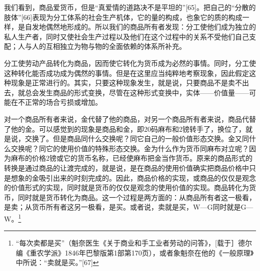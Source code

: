 \documentclass{ctexbook}
\begin{document}
        
        我们看到，商品爱货币，但是“真爱情的道路决不是平坦的”[65]。把自己的“分散的肢体”[66]表现为分工体系的社会生产机体，它的量的构成，也象它的质的构成一样，是自发地偶然地形成的。所以我们的商品所有者发现：分工使他们成为独立的私人生产者，同时又使社会生产过程以及他们在这个过程中的关系不受他们自己支配；人与人的互相独立为物与物的全面依赖的体系所补充。
        
        分工使劳动产品转化为商品，因而使它转化为货币成为必然的事情。同时，分工使这种转化能否成功成为偶然的事情。但是在这里应当纯粹地考察现象，因此假定这种现象是正常进行的。其实，只要这种现象发生，就是说，只要商品不是卖不出去，就总会发生商品的形式变换，尽管在这种形式变换中，实体——价值量——可能在不正常的场合亏损或增加。
        
        对一个商品所有者来说，金代替了他的商品，对另一个商品所有者来说，商品代替了他的金。可以感觉到的现象是商品和金，即20码麻布和2镑转手了，换位了，就是说，交换了。但是商品同什么交换呢？同它自己的一般价值形态交换。金又同什么交换呢？同它的使用价值的特殊形态交换。金为什么作为货币同麻布对立呢？因为麻布的价格2镑或它的货币名称，已经使麻布把金当作货币。原来的商品形式的转换是通过商品的让渡完成的，就是说，是在商品的使用价值确实把商品价格中只是想象的金吸引出来的时刻完成的。因此，商品价格的实现，或商品的仅仅是观念的价值形式的实现，同时就是货币的仅仅是观念的使用价值的实现。商品转化为货币，同时就是货币转化为商品。这一个过程是两方面的：从商品所有者这一极看，是卖；从货币所有者这另一极看，是买。或者说，卖就是买，W—G同时就是G—W。\footnote{“每次卖都是买”（魁奈医生《关于商业和手工业者劳动的问答》，[载于］德尔编《重农学派》1846年巴黎版第1部第170页），或者象魁奈在他的《一般原理》中所说：“卖就是买。”[67]}
        
\end{document}
